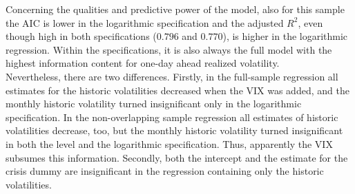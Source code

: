 Concerning the qualities and predictive power of the model, also for this sample the AIC is lower in the logarithmic specification and the adjusted $R^{2}$, even though high in both specifications ($0.796$ and $0.770$), is higher in the logarithmic regression. Within the specifications, it is also always the full model with the highest information content for one-day ahead realized volatility.\\
Nevertheless, there are two differences. Firstly, in the full-sample regression all estimates for the historic volatilities decreased when the VIX was added, and the monthly historic volatility turned insignificant only in the logarithmic specification. In the non-overlapping sample regression all estimates of historic volatilities decrease, too, but the monthly historic volatility turned insignificant in both the level and the logarithmic specification. Thus, apparently the VIX subsumes this information. Secondly, both the intercept and the estimate for the crisis dummy are insignificant in the regression containing only the historic volatilities.


\newpage
















